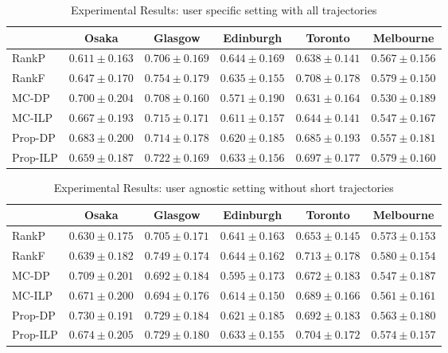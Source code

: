 \begin{table*}
\centering
\caption{Experimental Results: user specific setting with all trajectories}
\begin{tabular}{l|ccccc} \hline
 & Osaka & Glasgow & Edinburgh & Toronto & Melbourne \\ \hline
RankP & $0.611\pm0.163$ & $0.706\pm0.169$ & $\mathbf{0.644\pm0.169}$ & $0.638\pm0.141$ & $0.567\pm0.156$ \\
RankF & $0.647\pm0.170$ & $\mathbf{0.754\pm0.179}$ & $0.635\pm0.155$ & $\mathbf{0.708\pm0.178}$ & $0.579\pm0.150$ \\
MC-DP & $\mathbf{0.700\pm0.204}$ & $0.708\pm0.160$ & $0.571\pm0.190$ & $0.631\pm0.164$ & $0.530\pm0.189$ \\
MC-ILP & $0.667\pm0.193$ & $0.715\pm0.171$ & $0.611\pm0.157$ & $0.644\pm0.141$ & $0.547\pm0.167$ \\
Prop-DP & $0.683\pm0.200$ & $0.714\pm0.178$ & $0.620\pm0.185$ & $0.685\pm0.193$ & $0.557\pm0.181$ \\
Prop-ILP & $0.659\pm0.187$ & $0.722\pm0.169$ & $0.633\pm0.156$ & $0.697\pm0.177$ & $\mathbf{0.579\pm0.160}$ \\
\hline
\end{tabular}
\end{table*}

\begin{table*}
\centering
\caption{Experimental Results: user agnostic setting without short trajectories}
\begin{tabular}{l|ccccc} \hline
 & Osaka & Glasgow & Edinburgh & Toronto & Melbourne \\ \hline
RankP & $0.630\pm0.175$ & $0.705\pm0.171$ & $0.641\pm0.163$ & $0.653\pm0.145$ & $0.573\pm0.153$ \\
RankF & $0.639\pm0.182$ & $\mathbf{0.749\pm0.174}$ & $\mathbf{0.644\pm0.162}$ & $\mathbf{0.713\pm0.178}$ & $\mathbf{0.580\pm0.154}$ \\
MC-DP & $0.709\pm0.201$ & $0.692\pm0.184$ & $0.595\pm0.173$ & $0.672\pm0.183$ & $0.547\pm0.187$ \\
MC-ILP & $0.671\pm0.200$ & $0.694\pm0.176$ & $0.614\pm0.150$ & $0.689\pm0.166$ & $0.561\pm0.161$ \\
Prop-DP & $\mathbf{0.730\pm0.191}$ & $0.729\pm0.184$ & $0.621\pm0.185$ & $0.692\pm0.183$ & $0.563\pm0.180$ \\
Prop-ILP & $0.674\pm0.205$ & $0.729\pm0.180$ & $0.633\pm0.155$ & $0.704\pm0.172$ & $0.574\pm0.157$ \\
\hline
\end{tabular}
\end{table*}

